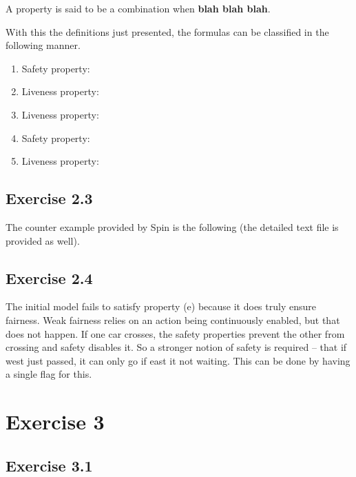 \documentclass[12pt]{article}
\newcommand{\idea}[1]{\textcolor{darkyellow}{#1}}
\newcommand{\blah}{\textbf{blah blah blah}}
\begin{document}
\begin{enumerate}[label=\roman*.]
\idea{A property is said to be a combination when \blah{}.}

\idea{With this the definitions just presented, the formulas can be classified in the following manner.}

\begin{enumerate}[label=(\alph*)]
  \item Safety property:

  \item Liveness property:

  \item Liveness property:

  \item Safety property:

  \item Liveness property:

\end{enumerate}

\subsection*{Exercise 2.3}

\idea{The counter example provided by Spin is the following (the detailed text file is provided as well).}


\subsection*{Exercise 2.4}

\idea{The initial model fails to satisfy property (e) because it does truly ensure fairness.}
\idea{Weak fairness relies on an action being continuously enabled, but that does not happen.}
\idea{If one car crosses, the safety properties prevent the other from crossing and safety disables it.}
\idea{So a stronger notion of safety is required -- that if west just passed, it can only go if east it not waiting.}
\idea{This can be done by having a single flag for this.}

\section*{Exercise 3}

\subsection*{Exercise 3.1}



\end{enumerate}
\end{document}

